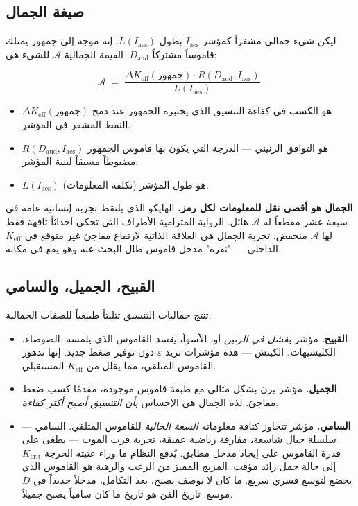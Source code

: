 \documentclass[12pt,a4paper]{article}
\newcommand{\Keff}{K_{\mathrm{eff}}}
\begin{document}
	\subsection{صيغة الجمال}
	
	ليكن شيء جمالي مشفراً كمؤشر \(I_{\mathrm{aes}}\) بطول \(L(I_{\mathrm{aes}})\). إنه موجه إلى جمهور يمتلك قاموساً مشتركاً \(D_{\mathrm{aud}}\). القيمة الجمالية \(\mathcal{A}\) للشيء هي:
	
	\[
	\mathcal{A} \; = \; \frac{\Delta\Keff(\text{جمهور}) \cdot R(D_{\mathrm{aud}}, I_{\mathrm{aes}})}{L(I_{\mathrm{aes}})}.
	\]
	
	\begin{itemize}[leftmargin=*]
		\item \(\Delta\Keff(\text{جمهور})\) هو الكسب في كفاءة التنسيق الذي يختبره الجمهور عند دمج النمط المشفر في المؤشر.
		\item \(R(D_{\mathrm{aud}}, I_{\mathrm{aes}})\) هو التوافق الرنيني — الدرجة التي يكون بها قاموس الجمهور مضبوطاً مسبقاً لبنية المؤشر.
		\item \(L(I_{\mathrm{aes}})\) هو طول المؤشر (تكلفة المعلومات).
	\end{itemize}
	
	\textbf{الجمال هو أقصى نقل للمعلومات لكل رمز.} الهايكو الذي يلتقط تجربة إنسانية عامة في سبعة عشر مقطعاً له \(\mathcal{A}\) هائل. الرواية المترامية الأطراف التي تحكي أحداثاً تافهة فقط لها \(\mathcal{A}\) منخفض. تجربة الجمال هي العلاقة الذاتية لارتفاع مفاجئ غير متوقع في \(K_{\mathrm{eff}}\) الداخلي — "نقرة" مدخل قاموس طال البحث عنه وهو يقع في مكانه.
	
	\subsection{القبيح، الجميل، والسامي}
	
	تنتج جماليات التنسيق تثليثاً طبيعياً للصفات الجمالية:
	
	\begin{itemize}[leftmargin=*]
		\item \textbf{القبيح.} مؤشر \emph{يفشل في الرنين} أو، الأسوأ، \emph{يفسد} القاموس الذي يلمسه. الضوضاء، الكليشيهات، الكيتش — هذه مؤشرات تزيد \(\varepsilon\) دون توفير ضغط جديد. إنها تدهور القاموس المتلقي، مما يقلل من \(K_{\mathrm{eff}}\) المستقبلي.
		\item \textbf{الجميل.} مؤشر يرن بشكل مثالي مع طبقة قاموس موجودة، مقدمًا كسب ضغط مفاجئ. لذة الجمال هي الإحساس \emph{بأن التنسيق أصبح أكثر كفاءة}.
		\item \textbf{السامي.} مؤشر تتجاوز كثافة معلوماته \emph{السعة الحالية} للقاموس المتلقي. السامي — سلسلة جبال شاسعة، مفارقة رياضية عميقة، تجربة قرب الموت — يطغى على قدرة القاموس على إيجاد مدخل مطابق. يُدفع النظام ما وراء عتبته الحرجة \(K_{\mathrm{crit}}\) إلى حالة حمل زائد مؤقت. المزيج المميز من الرعب والرهبة هو القاموس الذي يخضع لتوسع قسري سريع. ما كان لا يوصف يصبح، بعد التكامل، مدخلاً جديداً في \(D\) موسع. تاريخ الفن هو تاريخ ما كان سامياً يصبح جميلاً.
	\end{itemize}
	
\end{document}
